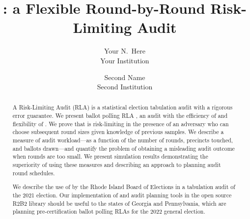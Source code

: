 \date{}

\title{\Large \bf \Providence: a Flexible Round-by-Round Risk-Limiting Audit}


\author{
{\rm Your N.\ Here}\\
Your Institution
\and
{\rm Second Name}\\
Second Institution
} %

\maketitle

\begin{abstract}
A Risk-Limiting Audit (RLA) is a statistical election tabulation audit with a rigorous error guarantee. We present ballot polling RLA \Providence, an audit with the efficiency of \Minerva and flexibility of \BRAVO. We prove that \Providence is risk-limiting in the presence of an adversary who can choose subsequent round sizes given knowledge of previous samples. We describe a measure of audit workload---as a function of the number of rounds, precincts touched, and ballots drawn---and quantify the problem of obtaining a misleading audit outcome when rounds are too small. We present simulation results demonstrating the superiority of \Providence using these measures and describing an approach to planning audit round schedules. 

We describe the use of \Providence by the Rhode Island Board of Elections in a tabulation audit of the 2021 election. Our implementation of \Providence and audit planning tools in the open source R2B2 library should be useful to the states of Georgia and Pennsylvania, which are planning pre-certification ballot polling RLAs for the 2022 general election. 
\end{abstract}
%
%


